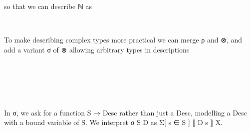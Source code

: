 so that we can describe ℕ as
\begin{code}%
%
\>[2]%
\>[6]\AgdaSymbol{:}\AgdaSpace{}%
\<%
\\
%
\>[2]%
\>[6]\AgdaSymbol{=}\AgdaSpace{}%
\AgdaSpace{}%
\AgdaSpace{}%
\<%
\end{code}
To make describing complex types more practical we can merge ρ and ⊗, and add a variant σ of ⊗ allowing arbitrary types in descriptions
\begin{code}[hide]%
\>[0]\AgdaSpace{}%
\AgdaSpace{}%
\<%
\end{code}
\begin{code}%
\>[0][@{}l@{\AgdaIndent{1}}]%
\>[2]\AgdaSpace{}%
\AgdaSpace{}%
\AgdaSymbol{:}\AgdaSpace{}%
\AgdaSpace{}%
\<%
\\
\>[2][@{}l@{\AgdaIndent{0}}]%
\>[4]%
\>[9]\AgdaSymbol{:}\AgdaSpace{}%
\<%
\\
%
\>[4]%
\>[9]\AgdaSymbol{:}\AgdaSpace{}%
\AgdaSpace{}%
\AgdaSpace{}%
\<%
\\
%
\>[4]%
\>[9]\AgdaSymbol{:}\AgdaSpace{}%
\AgdaSymbol{(}\AgdaSpace{}%
\AgdaSymbol{:}\AgdaSpace{}%
\AgdaSymbol{)}\AgdaSpace{}%
\AgdaSpace{}%
\AgdaSymbol{(}\AgdaSpace{}%
\AgdaSpace{}%
\AgdaSymbol{)}\AgdaSpace{}%
\AgdaSpace{}%
\<%
\\
%
\>[4]%
\>[9]\AgdaSymbol{:}\AgdaSpace{}%
\AgdaSpace{}%
\AgdaSpace{}%
\AgdaSpace{}%
\AgdaSpace{}%
\<%
\end{code}
In σ, we ask for a function S → Desc rather than just a Desc, modelling a Desc with a bound variable of S. We interpret σ S D as Σ[ s ∈ S ] ⟦ D s ⟧ X.

